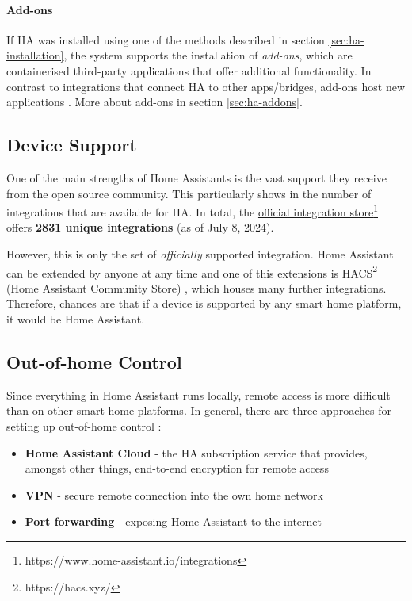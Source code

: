 \paragraph{Add-ons}
If HA was installed using one of the methods described in section \ref{sec:ha-installation}, the system supports the installation of \textit{add-ons}, which are containerised third-party applications that offer additional functionality. In contrast to integrations that connect HA to other apps/bridges, add-ons host new applications \cite{HomeAssistant_Docs_Concepts}. More about add-ons in section \ref{sec:ha-addons}.

\subsection{Device Support}
One of the main strengths of Home Assistants is the vast support they receive from the open source community. This particularly shows in the number of integrations that are available for HA. In total, the \href{https://www.home-assistant.io/integrations}{official integration store}\footnote{https://www.home-assistant.io/integrations} offers \textbf{2831 unique integrations} \cite{HomeAssistant_Integrations} (as of July 8, 2024).

However, this is only the set of \textit{officially} supported integration. Home Assistant can be extended by anyone at any time and one of this extensions is \href{https://hacs.xyz/}{HACS}\footnote{https://hacs.xyz/} (Home Assistant Community Store) \cite{HACS_Homepage}, which houses many further integrations. Therefore, chances are that if a device is supported by any smart home platform, it would be Home Assistant.

\newpage

\subsection{Out-of-home Control}
\label{sec:ha-remote-access}
Since everything in Home Assistant runs locally, remote access is more difficult than on other smart home platforms. In general, there are three approaches for setting up out-of-home control \cite{HomeAssistant_Remote_Access}:

\begin{itemize}
    \item \textbf{Home Assistant Cloud} - the HA subscription service that provides, amongst other things, end-to-end encryption for remote access
    \item \textbf{VPN} - secure remote connection into the own home network
    \item \textbf{Port forwarding} - exposing Home Assistant to the internet
\end{itemize}

